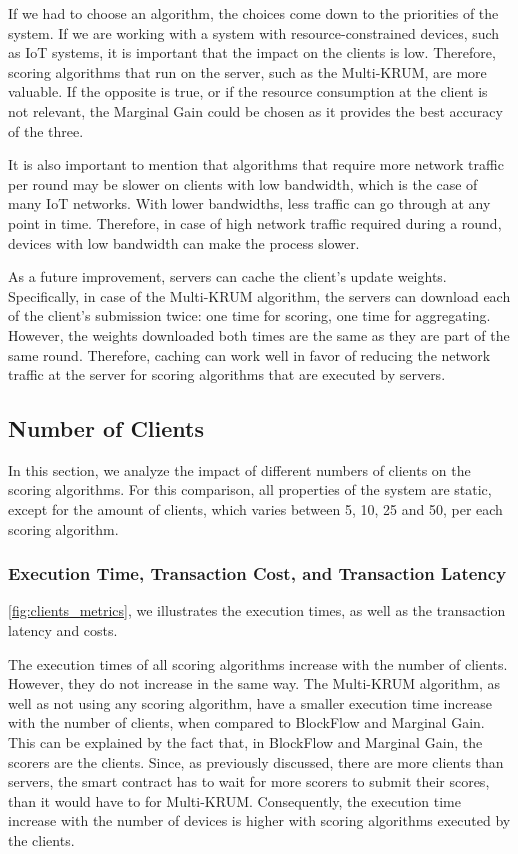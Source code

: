 If we had to choose an algorithm, the choices come down to the priorities of the system. If we are working with a system with resource-constrained devices, such as IoT systems, it is important that the impact on the clients is low. Therefore, scoring algorithms that run on the server, such as the Multi-KRUM, are more valuable. If the opposite is true, or if the resource consumption at the client is not relevant, the Marginal Gain could be chosen as it provides the best accuracy of the three.

It is also important to mention that algorithms that require more network traffic per round may be slower on clients with low bandwidth, which is the case of many IoT networks. With lower bandwidths, less traffic can go through at any point in time. Therefore, in case of high network traffic required during a round, devices with low bandwidth can make the process slower.

As a future improvement, servers can cache the client's update weights. Specifically, in case of the Multi-KRUM algorithm, the servers can download each of the client's submission twice: one time for scoring, one time for aggregating. However, the weights downloaded both times are the same as they are part of the same round. Therefore, caching can work well in favor of reducing the network traffic at the server for scoring algorithms that are executed by servers.

\subsection{Number of Clients}\label{horizontal:number_of_clients}

In this section, we analyze the impact of different numbers of clients on the scoring algorithms. For this comparison, all properties of the system are static, except for the amount of clients, which varies between 5, 10, 25 and 50, per each scoring algorithm.

\subsubsection{Execution Time, Transaction Cost, and Transaction Latency}

\autoref{fig:clients_metrics}, we illustrates the execution times, as well as the transaction latency and costs.

The execution times of all scoring algorithms increase with the number of clients. However, they do not increase in the same way. The Multi-KRUM algorithm, as well as not using any scoring algorithm, have a smaller execution time increase with the number of clients, when compared to BlockFlow and Marginal Gain. This can be explained by the fact that, in BlockFlow and Marginal Gain, the scorers are the clients. Since, as previously discussed, there are more clients than servers, the smart contract has to wait for more scorers to submit their scores, than it would have to for Multi-KRUM. Consequently, the execution time increase with the number of devices is higher with scoring algorithms executed by the clients.


